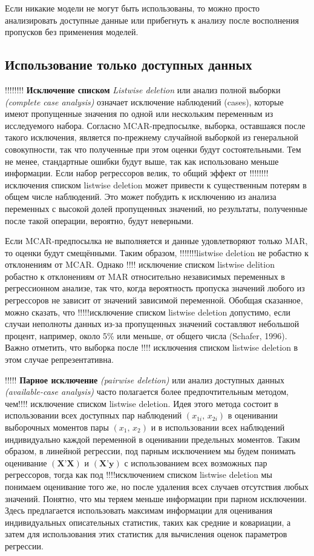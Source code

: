 Если никакие модели не могут быть использованы, то можно просто анализировать доступные данные или прибегнуть к анализу после восполнения пропусков без применения моделей.

\subsection{Использование только доступных данных}
!!!!!!!! {\bf Исключение списком} \emph{Listwise deletion} или анализ полной выборки \emph{(complete case analysis)} означает исключение наблюдений (cases), которые имеют пропущенные значения по одной или нескольким переменным из исследуемого набора. Согласно MCAR-предпосылке, выборка, оставшаяся после такого исключения, является по-прежнему случайной выборкой из генеральной совокупности, так что полученные при этом оценки будут состоятельными. Тем не менее, стандартные ошибки будут выше, так как использовано меньше информации. Если набор регрессоров велик, то общий эффект от !!!!!!!! исключения списком listwise deletion может привести к существенным потерям в общем числе наблюдений. Это может побудить к исключению из анализа переменных с высокой долей пропущенных значений, но результаты, полученные после такой операции, вероятно, будут неверными. 

Если MCAR-предпосылка не выполняется и данные удовлетворяют только MAR, то оценки будут смещёнными. Таким образом, !!!!!!!listwise deletion не робастно к отклонениям от MCAR. Однако !!!! исключение списком listwise delition робастно к отклонениям от MAR относительно независимых переменных в регрессионном анализе, так что, когда вероятность пропуска значений любого из регрессоров не зависит от значений зависимой переменной. Обобщая сказанное, можно сказать, что !!!!!исключение списком listwise deletion допустимо, если случаи неполноты данных из-за пропущенных значений составляют небольшой процент, например, около 5\% или меньше, от общего числа (Schafer, 1996). Важно отметить, что выборка после !!!! исключения списком listwise deletion в этом случае репрезентативна. 



!!!!! {\bf Парное исключение} \emph{(pairwise deletion)} или анализ доступных данных \emph{(available-case analysis)} часто полагается более предпочтительным методом, чем!!!! исключение списком listwise deletion. Идея этого метода состоит в использовании всех доступных пар наблюдений $(x_{1i}, \, x_{2i})$ в оценивании выборочных моментов пары $(x_1, \, x_2)$ и в использовании всех наблюдений индивидуально каждой переменной  в оценивании предельных моментов. Таким образом, в линейной регрессии, под парным исключением мы будем понимать оценивание $(\mathbf{X’X})$ и $(\mathbf{X’y})$ с использованием всех возможных пар регрессоров, тогда как под !!!!исключением списком listwise deletion мы понимаем оценивание того же, но после удаления всех случаев отсутствия любых значений. Понятно, что мы теряем меньше информации при парном исключении. Здесь предлагается использовать максимам информации для оценивания индивидуальных описательных статистик, таких как средние и ковариации, а затем для использования этих статистик для вычисления оценок параметров регрессии.

